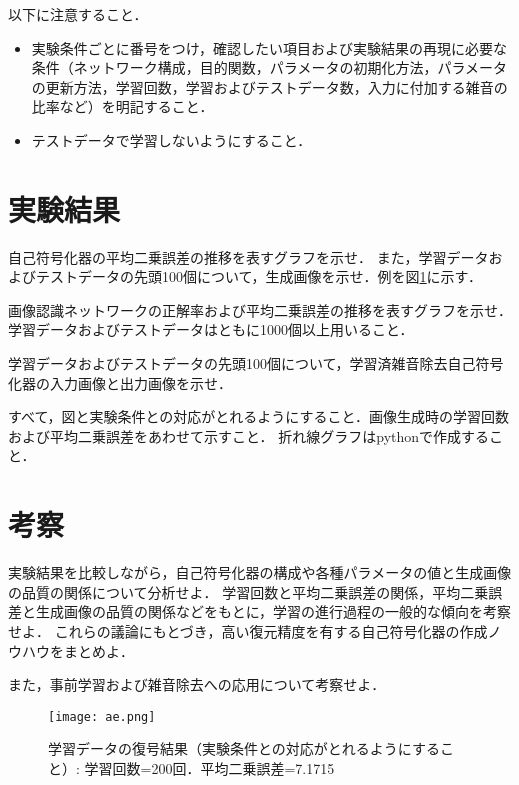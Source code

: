 \documentclass[12pt]{jsarticle}
\begin{document}
以下に注意すること．
\begin{itemize}
\item 実験条件ごとに番号をつけ，確認したい項目および実験結果の再現に必要な条件（ネットワーク構成，目的関数，パラメータの初期化方法，パラメータの更新方法，学習回数，学習およびテストデータ数，入力に付加する雑音の比率など）を明記すること．
\item テストデータで学習しないようにすること．
\end{itemize}


\section{実験結果}

自己符号化器の平均二乗誤差の推移を表すグラフを示せ．
また，学習データおよびテストデータの先頭100個について，生成画像を示せ．例を図\ref{fig:ae}に示す．

画像認識ネットワークの正解率および平均二乗誤差の推移を表すグラフを示せ．
学習データおよびテストデータはともに1000個以上用いること．

学習データおよびテストデータの先頭100個について，学習済雑音除去自己符号化器の入力画像と出力画像を示せ．

すべて，図と実験条件との対応がとれるようにすること．画像生成時の学習回数および平均二乗誤差をあわせて示すこと．
折れ線グラフはpythonで作成すること．

\section{考察}

実験結果を比較しながら，自己符号化器の構成や各種パラメータの値と生成画像の品質の関係について分析せよ．
学習回数と平均二乗誤差の関係，平均二乗誤差と生成画像の品質の関係などをもとに，学習の進行過程の一般的な傾向を考察せよ．
これらの議論にもとづき，高い復元精度を有する自己符号化器の作成ノウハウをまとめよ．

また，事前学習および雑音除去への応用について考察せよ．

\clearpage

\begin{figure}[tb]
\begin{center}
\texttt{[image: ae.png]}
\caption{学習データの復号結果（実験条件との対応がとれるようにすること）: 学習回数=200回．平均二乗誤差=7.1715} \label{fig:ae}
\end{center}
\end{figure}
\end{document}
